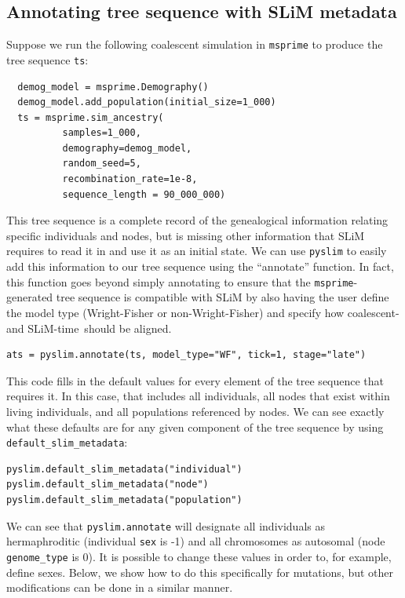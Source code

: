 \documentclass[12pt]{article}
\newcommand{\msprime}[0]{\texttt{msprime}\xspace}
\newcommand{\pyslim}[0]{\texttt{pyslim}\xspace}
\begin{document}
\subsection*{Annotating tree sequence with SLiM metadata}

Suppose we run the following coalescent simulation in \msprime to produce the tree sequence \verb|ts|:

\begin{verbatim}
  demog_model = msprime.Demography()
  demog_model.add_population(initial_size=1_000)
  ts = msprime.sim_ancestry(
          samples=1_000,
          demography=demog_model,
          random_seed=5,
          recombination_rate=1e-8,
          sequence_length = 90_000_000)
\end{verbatim}

This tree sequence is a complete record of the genealogical information relating specific individuals
and nodes, but is missing other information that  SLiM requires to read it in and use it as an initial state.
We can use \pyslim to easily add this information to our tree sequence using the ``annotate'' function.
In fact, this function goes beyond simply annotating to ensure that the \msprime-generated tree sequence
is compatible with SLiM by also having the user define the model type (Wright-Fisher or non-Wright-Fisher)
and specify how coalescent- and SLiM-time\ should be aligned.

\begin{verbatim}
ats = pyslim.annotate(ts, model_type="WF", tick=1, stage="late")
\end{verbatim}

This code fills in the default values for every element of the tree sequence that requires it. 
In this case, that includes all individuals, all nodes that exist within living individuals, and all
populations referenced by nodes. We can see exactly what these defaults
are for any given component of the tree sequence by using \verb|default_slim_metadata|:

\begin{verbatim}
pyslim.default_slim_metadata("individual")
pyslim.default_slim_metadata("node")
pyslim.default_slim_metadata("population")
\end{verbatim}

We can see that \verb|pyslim.annotate| will designate all individuals as hermaphroditic (individual \verb|sex| is -1) and
all chromosomes as autosomal (node \verb|genome_type| is 0). It is possible to change these values in order to,
for example, define sexes. Below, we show how to do this specifically for mutations, but other modifications
can be done in a similar manner.
\end{document}
